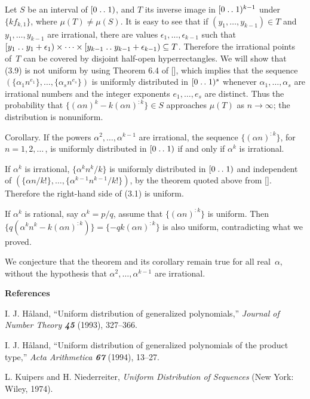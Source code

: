 Let $S$ be an interval of $[0\mathrel{.\,.} 1)$, and $T$ its inverse image in $[0\mathrel{.\,.}
1)^{k-1}$ under $\{kf_{k,1}\}$, where $\mu(T)\neq\mu(S)$. 
It is easy to see that if $(y_1,\ldots,y_{k-1})\in T$ and $y_1,\ldots,y_{k-1}$
are irrational, there are values $\epsilon_1,\ldots,\epsilon_{k-1}$ such that
$[y_1\mathrel{.\,.} y_1+\epsilon_1)\times\cdots\times[y_{k-1}\mathrel{.\,.}
y_{k-1}+\epsilon_{k-1})\subseteq T$. 
Therefore the irrational points of~$T$ can be
covered by disjoint half-open hyperrectangles.
We will show that (3.9) is not uniform by using Theorem 6.4 of [\KN], which
implies that the sequence $(\{\alpha_1n^{e_1}\},\ldots,\{\alpha_sn^{e_s}\})$ is
uniformly distributed in $[0\mathrel{.\,.} 1)^s$ whenever $\alpha_1,\ldots,\alpha_s$ are
irrational numbers and the integer exponents $e_1,\ldots,e_s$ are distinct.
Thus
the probability that $\{(\alpha n)^k-k(\alpha n)^{:k}\}\in S$ approaches
$\mu(T)$ as $n\rightarrow\infty$; the distribution is nonuniform. \ \pfbox

\proclaim
Corollary. 
If the powers $\alpha^2,\ldots,\alpha^{k-1}$ are irrational, the
sequence $\{(\alpha n)^{:k}\}$, for $n=1,2,\ldots\,$, is
uniformly distributed in $[0\mathrel{.\,.} 1)$ if and only if $\alpha^k$ is irrational.

\proof
If $\alpha^k$ is irrational, $\{\alpha^kn^k\!/k\}$ is uniformly distributed in
$[0\mathrel{.\,.} 1)$ and independent of $(\{\alpha
n/k!\},\ldots,\{\alpha^{k-1}n^{k-1}\!/k!\})$, by the theorem quoted above from
[\KN]. Therefore the right-hand side of (3.1) is uniform.

If $\alpha^k$ is rational, say $\alpha^k=p/q$, assume that $\{(\alpha
n)^{:k}\}$ is uniform. Then $\{q(\alpha^kn^k-k(\alpha n)^{:k})\}=\{-qk(\alpha
n)^{:k}\}$ is also uniform, contradicting what we proved. \ \pfbox

\medskip
We conjecture that the theorem and its corollary remain true for all
real~$\alpha$, without the hypothesis that $\alpha^2,\ldots,\alpha^{k-1}$ are
irrational.

\bigskip
\centerline{\bf References}

\medskip
\bib
\Ha
\quad
I. J. H{\aa}land, ``Uniform distribution of generalized polynomials,''
 {\sl Journal of Number Theory\/ \bf 45} (1993), 327--366.

\bib
\Hb
\quad
I. J. H{\aa}land, ``Uniform distribution of generalized polynomials of the
product type,'' {\sl Acta Arithmetica\/ \bf67} (1994), 13--27.

\bib
\KN
\quad
L. Kuipers and H. Niederreiter, {\sl Uniform Distribution of Sequences\/}
(New York: Wiley, 1974).



